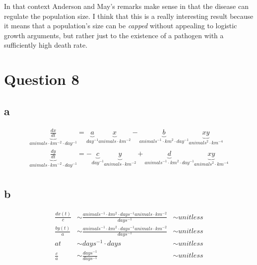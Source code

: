 \documentclass{unswmaths}
\begin{document}
In that context Anderson and May's remarks make sense in that the disease can regulate the population size. I think that this is a really interesting result because it means that a population's size can be \emph{capped} without appealing to logistic growth arguments, but rather just to the existence of a pathogen with a sufficiently high death rate.
\section*{Question 8}
\subsection*{a}
    \begin{align*}
        \underbrace{\frac{dx}{dt}}_{animals\cdot km^{-2} \cdot day^{-1}} = \underbrace{a}_{day^{-1}}\underbrace{x}_{animals \cdot km^{-2}} - \underbrace{b}_{animals^{-1} \cdot km^{2} \cdot day^{-1}}\underbrace{xy}_{animals^{2} \cdot km^{-4}} \\
        \underbrace{\frac{dy}{dt}}_{animals\cdot km^{-2} \cdot day^{-1}} = -\underbrace{c}_{day^{-1}}\underbrace{y}_{animals \cdot km^{-2}} + \underbrace{d}_{animals^{-1} \cdot km^{2} \cdot day^{-1}}\underbrace{xy}_{animals^{2} \cdot km^{-4}} \\
    \end{align*}
\subsection*{b}
     \begin{align*}
        \frac{dx(t)}{c} &\sim \frac{animals^{-1} \cdot km^2 \cdot days^{-1} animals \cdot km^{-2}}{days^{-1}} &\sim unitless \\
        \frac{by(t)}{a} &\sim \frac{animals^{-1} \cdot km^2 \cdot days^{-1} animals \cdot km^{-2}}{days^{-1}} &\sim unitless \\
        at &\sim days^{-1} \cdot days &\sim unitless \\
        \frac{c}{a} &\sim \frac{days^{-1}}{days^{-1}} &\sim unitless
     \end{align*}
\end{document}
